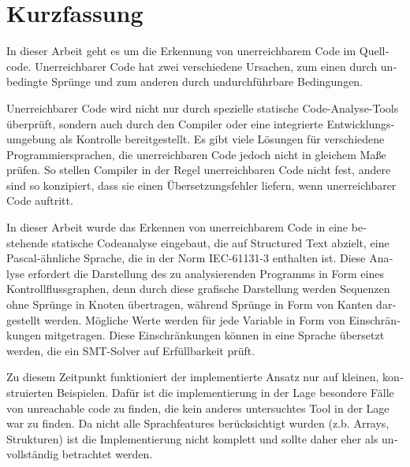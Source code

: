 \chapter{Kurzfassung}

\begin{german}
In dieser Arbeit geht es um die Erkennung von unerreichbarem Code im Quellcode. 
Unerreichbarer Code hat zwei verschiedene Ursachen, zum einen durch unbedingte Sprünge und zum anderen durch undurchführbare Bedingungen.

Unerreichbarer Code wird nicht nur durch spezielle statische Code-Analyse-Tools überprüft, sondern auch durch den Compiler oder eine integrierte Entwicklungsumgebung als Kontrolle bereitgestellt. Es gibt viele Lösungen für verschiedene Programmiersprachen, die unerreichbaren Code jedoch nicht in gleichem Maße prüfen. So stellen Compiler in der Regel unerreichbaren Code nicht fest, andere sind so konzipiert, dass sie einen Übersetzungsfehler liefern, wenn unerreichbarer Code auftritt.


In dieser Arbeit wurde das Erkennen von unerreichbarem Code in eine bestehende statische Codeanalyse eingebaut, die auf Structured Text abzielt, eine Pascal-ähnliche Sprache, die in der Norm IEC-61131-3 enthalten ist. Diese Analyse erfordert die Darstellung des zu analysierenden Programms in Form eines Kontrollflussgraphen, denn durch diese grafische Darstellung werden Sequenzen ohne Sprünge in Knoten übertragen, während Sprünge in Form von Kanten dargestellt werden. Mögliche Werte werden für jede Variable in Form von Einschränkungen mitgetragen. Diese Einschränkungen können in eine Sprache übersetzt werden, die ein SMT-Solver auf Erfüllbarkeit prüft. 

Zu diesem Zeitpunkt funktioniert der implementierte Ansatz nur auf kleinen, konstruierten Beispielen. Dafür ist die implementierung in der Lage besondere Fälle von unreachable code zu finden, die kein anderes untersuchtes Tool in der Lage war zu finden. Da nicht alle Sprachfeatures berücksichtigt wurden (z.b. Arrays, Strukturen) ist die Implementierung nicht komplett und sollte daher eher als unvollständig betrachtet werden.
\end{german}